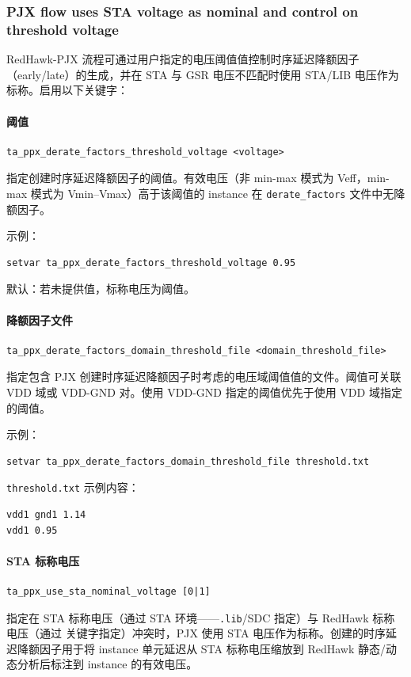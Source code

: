 \subsubsection*{PJX flow uses STA voltage as nominal and control on threshold voltage}

RedHawk-PJX 流程可通过用户指定的电压阈值值控制时序延迟降额因子（early/late）的生成，并在 STA 与 GSR 电压不匹配时使用 STA/LIB 电压作为标称。启用以下关键字：

\paragraph{阈值}
\begin{lstlisting}
ta_ppx_derate_factors_threshold_voltage <voltage>
\end{lstlisting}
指定创建时序延迟降额因子的阈值。有效电压（非 min-max 模式为 Veff，min-max 模式为 Vmin--Vmax）高于该阈值的 instance 在 \texttt{derate\_factors} 文件中无降额因子。

示例：
\begin{lstlisting}
setvar ta_ppx_derate_factors_threshold_voltage 0.95
\end{lstlisting}
默认：若未提供值，标称电压为阈值。

\paragraph{降额因子文件}
\begin{lstlisting}
ta_ppx_derate_factors_domain_threshold_file <domain_threshold_file>
\end{lstlisting}
指定包含 PJX 创建时序延迟降额因子时考虑的电压域阈值值的文件。阈值可关联 VDD 域或 VDD-GND 对。使用 VDD-GND 指定的阈值优先于使用 VDD 域指定的阈值。

示例：
\begin{lstlisting}
setvar ta_ppx_derate_factors_domain_threshold_file threshold.txt
\end{lstlisting}

\texttt{threshold.txt} 示例内容：
\begin{lstlisting}
vdd1 gnd1 1.14
vdd1 0.95
\end{lstlisting}

\paragraph{STA 标称电压}
\begin{lstlisting}
ta_ppx_use_sta_nominal_voltage [0|1]
\end{lstlisting}
指定在 STA 标称电压（通过 STA 环境——\texttt{.lib}/SDC 指定）与 RedHawk 标称电压（通过  关键字指定）冲突时，PJX 使用 STA 电压作为标称。创建的时序延迟降额因子用于将 instance 单元延迟从 STA 标称电压缩放到 RedHawk 静态/动态分析后标注到 instance 的有效电压。

